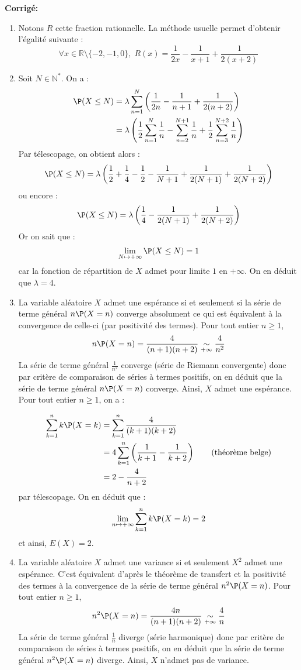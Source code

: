 \documentclass[a4paper,twoside,french,11pt]{VcCours}
\newcommand{\corr}{\textbf{Corrigé:}}
\begin{document}
\newpage

\corr \begin{enumerate}
\item Notons $R$ cette fraction rationnelle. La méthode usuelle permet d'obtenir l'égalité suivante :
$$ \forall x \in \mathbb{R} \setminus \lbrace -2,-1,0 \rbrace, \; R(x)= \dfrac{1}{2x}-\dfrac{1}{x+1}+\dfrac{1}{2(x+2)}$$
\item Soit $N\in \mathbb{N}^*$. On a :
\begin{align*}
\P(X\leq N) & =\lambda\sum\limits_{n=1}^{N}\left(\frac{1}{2n}-\frac{1}{n+1}+\frac{1}{2(n+2)}\right) \\
& =\lambda\left(  \dfrac{1}{2}\sum\limits_{n=1}^{N}\dfrac{1}{n}-\sum\limits_{n=2}^{N+1}\dfrac{1}{n}+\frac{1}{2}\sum\limits_{n=3}^{N+2}\dfrac{1}{n}\right) 
\end{align*}
Par télescopage, on obtient alors :
$$\P(X\leq N)=\lambda\left( \dfrac{1}{2}+\dfrac{1}{4}-\dfrac{1}{2}-\dfrac{1}{N+1}+\dfrac{1}{2(N+1)}+\dfrac{1}{2(N+2)}\right) $$ 
ou encore :
$$ \P(X\leq N)=\lambda\left( \dfrac{1}{4}-\dfrac{1}{2(N+1)}+\dfrac{1}{2(N+2)}\right) $$
Or on sait que :
$$\lim\limits_{N\mapsto+\infty} \P(X\leq N)=1$$
car la fonction de répartition de $X$ admet pour limite $1$ en $+ \infty$. On en déduit que $\lambda=4$.
\item La variable aléatoire $X$ admet une espérance si et seulement si la série de terme général $n \P(X=n)$ converge absolument ce qui est équivalent à la convergence de celle-ci (par positivité des termes). Pour tout entier $n \geq 1$,
$$ n \P(X=n) = \frac{4}{(n+1)(n+2)} \underset{+ \infty}{\sim} \dfrac{4}{n^2}$$
La série de terme général $\tfrac{1}{n^2}$ converge (série de Riemann convergente) donc par critère de comparaison de séries à termes positifs, on en déduit que la série de terme général $n \P(X=n)$ converge. Ainsi, $X$ admet une espérance. Pour tout entier $n \geq 1$, on a :

\begin{align*}
\sum\limits_{k=1}^{n}k \P(X=k) & =\sum\limits_{k=1}^{n}\dfrac{4}{(k+1)(k+2)} \\
& =4\sum\limits_{k=1}^{n}\left(\dfrac{1}{k+1}-\dfrac{1}{k+2} \right) \qquad \hbox{(théorème belge)}\\
&   =2-\dfrac{4}{n+2}
\end{align*}
par télescopage. On en déduit que :
$$\lim\limits_{n\mapsto+\infty}\sum\limits_{k=1}^{n}k \P(X=k)=2$$
et ainsi, $E(X)=2$.
\item La variable aléatoire $X$ admet une variance si et seulement $X^2$ admet une espérance. C'est équivalent d'après le théorème de transfert et la positivité des termes à la convergence de la série de terme général $n^2 \P(X=n)$. Pour tout entier $n \geq 1$,
$$ n^2 \P(X=n) = \frac{4n}{(n+1)(n+2)} \underset{+ \infty}{\sim} \dfrac{4}{n}$$
La série de terme général $\tfrac{1}{n}$ diverge (série harmonique) donc par critère de comparaison de séries à termes positifs, on en déduit que la série de terme général $n^2 \P(X=n)$ diverge. Ainsi, $X$ n'admet pas de variance.
\end{enumerate}
\end{document}
